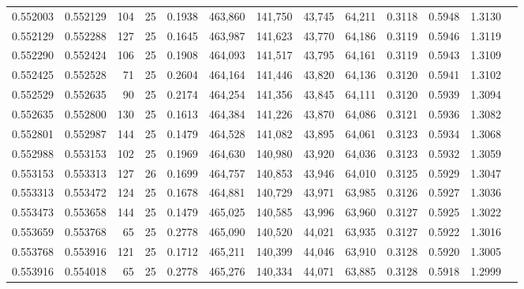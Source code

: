 \begin{tabular}{rrrrrrrrrrrrr}
0.552003 & 0.552129 &   104 &  25 &                                     0.1938 & 463,860 & 141,750 &  43,745 &  64,211 & 0.3118 & 0.5948 & 1.3130 \\
0.552129 & 0.552288 &   127 &  25 &                                     0.1645 & 463,987 & 141,623 &  43,770 &  64,186 & 0.3119 & 0.5946 & 1.3119 \\
0.552290 & 0.552424 &   106 &  25 &                                     0.1908 & 464,093 & 141,517 &  43,795 &  64,161 & 0.3119 & 0.5943 & 1.3109 \\
0.552425 & 0.552528 &    71 &  25 &                                     0.2604 & 464,164 & 141,446 &  43,820 &  64,136 & 0.3120 & 0.5941 & 1.3102 \\
0.552529 & 0.552635 &    90 &  25 &                                     0.2174 & 464,254 & 141,356 &  43,845 &  64,111 & 0.3120 & 0.5939 & 1.3094 \\
0.552635 & 0.552800 &   130 &  25 &                                     0.1613 & 464,384 & 141,226 &  43,870 &  64,086 & 0.3121 & 0.5936 & 1.3082 \\
0.552801 & 0.552987 &   144 &  25 &                                     0.1479 & 464,528 & 141,082 &  43,895 &  64,061 & 0.3123 & 0.5934 & 1.3068 \\
0.552988 & 0.553153 &   102 &  25 &                                     0.1969 & 464,630 & 140,980 &  43,920 &  64,036 & 0.3123 & 0.5932 & 1.3059 \\
0.553153 & 0.553313 &   127 &  26 &                                     0.1699 & 464,757 & 140,853 &  43,946 &  64,010 & 0.3125 & 0.5929 & 1.3047 \\
0.553313 & 0.553472 &   124 &  25 &                                     0.1678 & 464,881 & 140,729 &  43,971 &  63,985 & 0.3126 & 0.5927 & 1.3036 \\
0.553473 & 0.553658 &   144 &  25 &                                     0.1479 & 465,025 & 140,585 &  43,996 &  63,960 & 0.3127 & 0.5925 & 1.3022 \\
0.553659 & 0.553768 &    65 &  25 &                                     0.2778 & 465,090 & 140,520 &  44,021 &  63,935 & 0.3127 & 0.5922 & 1.3016 \\
0.553768 & 0.553916 &   121 &  25 &                                     0.1712 & 465,211 & 140,399 &  44,046 &  63,910 & 0.3128 & 0.5920 & 1.3005 \\
0.553916 & 0.554018 &    65 &  25 &                                     0.2778 & 465,276 & 140,334 &  44,071 &  63,885 & 0.3128 & 0.5918 & 1.2999 \\

\end{tabular}
